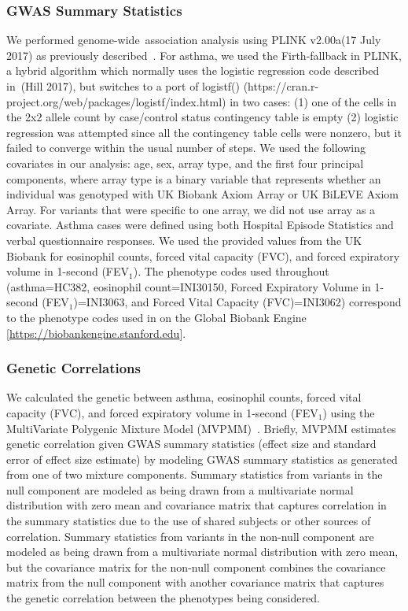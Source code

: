 \subsubsection*{GWAS Summary Statistics}
We performed genome-wide association analysis using PLINK v2.00a(17 July 2017) as previously described~\cite{DeBoever179762}. For asthma, we used the Firth-fallback in PLINK, a hybrid algorithm which normally uses the logistic regression code described in (Hill 2017), but switches to a port of logistf() (https://cran.r-project.org/web/packages/logistf/index.html) in two cases: (1) one of the cells in the 2x2 allele count by case/control status contingency table is empty (2) logistic regression was attempted since all the contingency table cells were nonzero, but it failed to converge within the usual number of steps. We used the following covariates in our analysis: age, sex, array type, and the first four principal components, where array type is a binary variable that represents whether an individual was genotyped with UK Biobank Axiom Array or UK BiLEVE Axiom Array. For variants that were specific to one array, we did not use array as a covariate. Asthma cases were defined using both Hospital Episode Statistics and verbal questionnaire responses. We used the provided values from the UK Biobank for eosinophil counts, forced vital capacity (FVC), and forced expiratory volume in 1-second (FEV$_1$). The phenotype codes used throughout (asthma=HC382, eosinophil count=INI30150, Forced Expiratory Volume in 1-second (FEV$_1$)=INI3063, and Forced Vital Capacity (FVC)=INI3062) correspond to the phenotype codes used in on the Global Biobank Engine [\url{https://biobankengine.stanford.edu}].

\subsubsection*{Genetic Correlations}
We calculated the genetic between asthma, eosinophil counts, forced vital capacity (FVC), and forced expiratory volume in 1-second (FEV$_1$) using the MultiVariate Polygenic Mixture Model (MVPMM)~\cite{DeBoever2017}. Briefly, MVPMM estimates genetic correlation given GWAS summary statistics (effect size and standard error of effect size estimate) by modeling GWAS summary statistics as generated from one of two mixture components. Summary statistics from variants in the null component are modeled as being drawn from a multivariate normal distribution with zero mean and covariance matrix that captures correlation in the summary statistics due to the use of shared subjects or other sources of correlation. Summary statistics from variants in the non-null component are modeled as being drawn from a multivariate normal distribution with zero mean, but the covariance matrix for the non-null component combines the covariance matrix from the null component with another covariance matrix that captures the genetic correlation between the phenotypes being considered.

